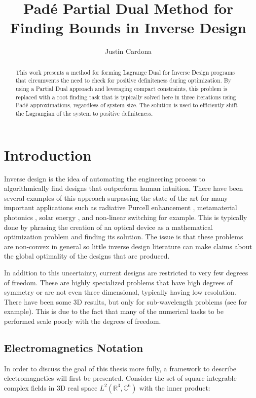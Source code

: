 \documentclass[twocolumn]{revtex4-2}
\begin{document}
\title{Padé Partial Dual Method for Finding Bounds in Inverse Design}
\author{Justin Cardona}
\begin{abstract}
This work presents a method for forming Lagrange Dual for Inverse Design programs that circumvents the need to check for positive definiteness during optimization. By using a Partial Dual approach and leveraging compact constraints, this problem is replaced with a root finding task that is typically solved here in three iterations using Padé approximations, regardless of system size. The solution is used to efficiently shift the Lagrangian of the system to positive definiteness.
\end{abstract}
\maketitle

\section{Introduction}
\label{sec:intro}
Inverse design is the idea of automating the engineering process to algorithmically find designs that outperform human intuition. There have been several examples of this approach surpassing the state of the art for many important applications such as radiative Purcell enhancement \cite{molesky2020hierarchical}, metamaterial photonics \cite{shen2014ultra}, solar energy \cite{ganapati2013light}, and non-linear switching \cite{elesin2012design} for example. This is typically done by phrasing the creation of an optical device as a mathematical optimization problem and finding its solution. The issue is that these problems are non-convex in general so little inverse design literature can make claims about the global optimality of the designs that are produced.

In addition to this uncertainty, current designs are restricted to very few degrees of freedom. These are highly specialized problems that have high degrees of symmetry or are not even three dimensional, typically having low resolution. There have been some 3D results, but only for sub-wavelength problems (see \cite{xue2023fullwave} for example). This is due to the fact that many of the numerical tasks to be performed scale poorly with the degrees of freedom.
\subsection{Electromagnetics Notation}
\label{sec:notation}
In order to discuss the goal of this thesis more fully, a framework to describe electromagnetics will first be presented. Consider the set of square integrable complex fields in 3D real space $L^2(\mathbb{R}^3, \mathbb{C}^6)$ with the inner product:
\end{document}
